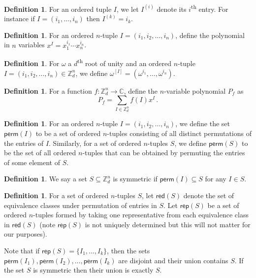 \documentclass[11pt]{article}
\numberwithin{equation}{section}
\theoremstyle{definition}
\theoremstyle{plain}
\newcommand{\C}{\mathbb C}
\newcommand{\Z}{\mathbb Z}
\theoremstyle{definition}
\newtheorem{define}[theorem]{Definition}
\renewcommand\Z{{\mathbb{Z}}}
\renewcommand\C{{\mathbb{C}}}
\newcommand\perm{\textsf{perm}}
\newcommand\rep{\textsf{rep}}
\newcommand\red{\textsf{red}}
\newcommand{\ts}{\textsuperscript}
\begin{document}
\begin{define}
For an ordered tuple $I$, %
%
we let $I^{(i)}$ denote its $i$\ts{th} entry.  
For instance if $I = (i_1, \dots, i_n)$ then $I^{(k)} = i_k$.
\end{define}


\begin{define}\label{def:tupleexponent}
For an ordered $n$-tuple $I = (i_1,i_2, \dots ,i_n)$, define the polynomial
%
in    %
$n$ variables $x^I = x_1^{i_1} \cdots x_n^{i_n}$.
\end{define}

\begin{define}
For $\omega$ a $d$\ts{th} root of unity and an ordered $n$-tuple $I = (i_1,i_2, \dots ,i_n) \in \Z_d^n$, we define $\omega^{[I]} = (\omega^{i_1}, \dots , \omega^{i_n})$.

\end{define}

\begin{define}
For a function $f: \Z_d^n \rightarrow \C$, define the $n$-variable polynomial $P_f$ as 
\[
P_f = \sum_{I \in \Z_d^n} f(I)x^I \,.
\]
\end{define}



\begin{define}
For an ordered $n$-tuple $I = (i_1,i_2, \dots ,i_n)$, we define the set $\perm(I)$ to be a set of ordered $n$-tuples consisting of all distinct permutations of the entries of $I$.  Similarly, for a set of ordered $n$-tuples $S$, we define $\perm(S)$ to be the set of all ordered $n$-tuples that can be obtained by permuting the entries of some element of $S$.
\end{define}

\begin{define}
We say a set $S \subseteq \Z_d^n$ is symmetric if %
$\perm(I) \subseteq S$ for any $I \in S$. %
%
\end{define}

\begin{define}
For a set of ordered $n$-tuples $S$, let $\red(S)$ denote the set of equivalence classes under permutation of entries in $S$.  Let $\rep(S)$ be a set of ordered $n$-tuples formed by taking one representative from each equivalence class in $\red(S)$ (note $\rep(S)$ is not uniquely determined but this will not matter for our purposes).  
\end{define}
Note that if $\rep(S) = \{I_1, \dots , I_k \}$, then the sets $\perm(I_1), \perm(I_2), \dots , \perm(I_k)$ are disjoint and their union contains $S$.  If the set $S$ is symmetric then their union is exactly $S$.
\end{document}
